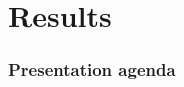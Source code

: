 \section{Results}
\begin{frame}
\frametitle{Presentation agenda}
\tableofcontents[currentsection]
\end{frame}
